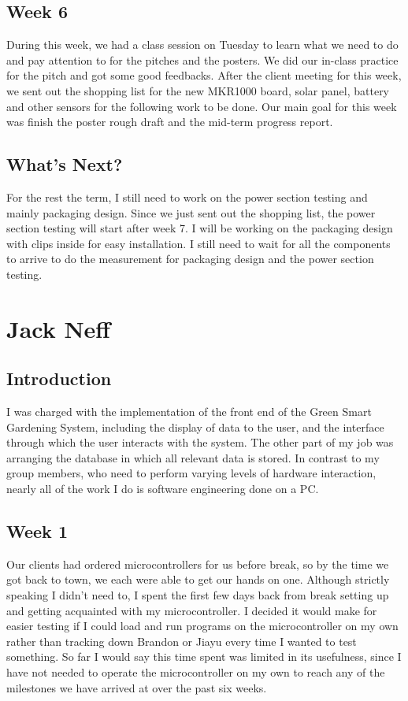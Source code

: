 \documentclass[IEEEtran,letterpaper,10pt,titlepage,fleqn,draftclsnofoot,onecolumn]{article}
\begin{document}
\subsection{Week 6}

During this week, we had a class session on Tuesday to learn what we need to do and pay attention to for the pitches and the posters. We did our in-class practice for the pitch and got some good feedbacks. After the client meeting for this week, we sent out the shopping list for the new MKR1000 board, solar panel, battery and other sensors for the following work to be done. Our main goal for this week was finish the poster rough draft and the mid-term progress report.

\subsection{What's Next?}

For the rest the term, I still need to work on the power section testing and mainly packaging design. Since we just sent out the shopping list, the power section testing will start after week 7. I will be working on the packaging design with clips inside for easy installation. I still need to wait for all the components to arrive to do the measurement for packaging design and the power section testing.

\section{Jack Neff}
\subsection{Introduction}

I was charged with the implementation of the front end of the Green Smart Gardening System, including the display of data to the user, and the interface through which the user interacts with the system. The other part of my job was arranging the database in which all relevant data is stored. In contrast to my group members, who need to perform varying levels of hardware interaction, nearly all of the work I do is software engineering done on a PC. 

\subsection{Week 1}

Our clients had ordered microcontrollers for us before break, so by the time we got back to town, we each were able to get our hands on one. Although strictly speaking I didn’t need to, I spent the first few days back from break setting up and getting acquainted with my microcontroller. I decided it would make for easier testing if I could load and run programs on the microcontroller on my own rather than tracking down Brandon or Jiayu every time I wanted to test something. So far I would say this time spent was limited in its usefulness, since I have not needed to operate the microcontroller on my own to reach any of the milestones we have arrived at over the past six weeks. 
\end{document}
